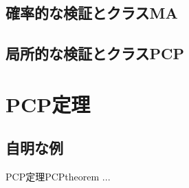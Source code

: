 \subsection{確率的な検証とクラスMA}
\subsection{局所的な検証とクラスPCP}

\section{PCP定理}

\subsection{自明な例}

\begin{theorem}{PCP定理}{PCPtheorem}
  ...
\end{theorem}
